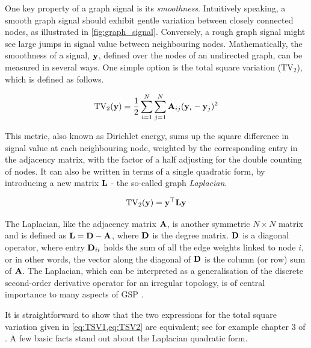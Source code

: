 One key property of a graph signal is its \textit{smoothness}. Intuitively speaking, a smooth graph signal should exhibit gentle variation between closely connected nodes, as illustrated in \cref{fig:graph_signal}. Conversely, a rough graph signal might see large jumps in signal value between neighbouring nodes. Mathematically, the smoothness of a signal, $\mathbf{y}$, defined over the nodes of an undirected graph, can be measured in several ways. One simple option is the total square variation ($\text{TV}_2$), which is defined as follows. 

\begin{equation}
    \label{eq:TSV1}
    \text{TV}_2(\mathbf{y}) = \frac{1}{2}\sum_{i=1}^N \sum_{j=1}^N \mathbf{A}_{ij} (\mathbf{y}_i - \mathbf{y}_j)^2
\end{equation}

This metric, also known as Dirichlet energy, sums up the square difference in signal value at each neighbouring node, weighted by the corresponding entry in the adjacency matrix, with the factor of a half adjusting for the double counting of nodes. It can also be written in terms of a single quadratic form, by introducing a new matrix $\mathbf{L}$ - the so-called graph \textit{Laplacian}. 

\begin{equation}
    \label{eq:TSV2}
    \text{TV}_2(\mathbf{y}) = \mathbf{y}^\top \mathbf{L} \mathbf{y}
\end{equation}

The Laplacian, like the adjacency matrix $\mathbf{A}$, is another symmetric $N \times N$ matrix and is defined as $\mathbf{L} = \mathbf{D} - \mathbf{A}$, where $\mathbf{D}$ is the degree matrix. $\mathbf{D}$ is a diagonal operator, where entry $\mathbf{D}_{ii}$ holds the sum of all the edge weights linked to node $i$, or in other words, the vector along the diagonal of $\mathbf{D}$ is the column (or row) sum of $\mathbf{A}$. The Laplacian, which can be interpreted as a generalisation of the discrete second-order derivative operator for an irregular topology, is of central importance to many aspects of GSP \citep{Shuman2013}. 

\newpage

It is straightforward to show that the two expressions for the total square variation given in \cref{eq:TSV1,eq:TSV2} are equivalent; see for example chapter 3 of \cite{Ortega2022}. A few basic facts stand out about the Laplacian quadratic form.

